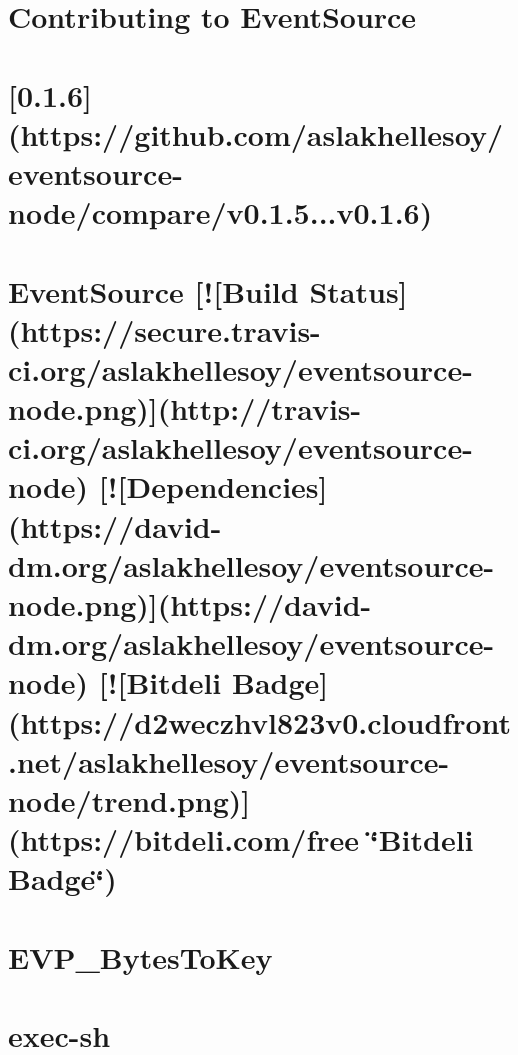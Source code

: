 \documentclass[twoside]{book}
\newcommand{\+}{\discretionary{\mbox{\scriptsize$\hookleftarrow$}}{}{}}
\begin{document}
\chapter{Contributing to Event\+Source}
\label{md__c_1_workspace_demo_src_main_script_node_modules_eventsource__c_o_n_t_r_i_b_u_t_i_n_g}

\chapter{\mbox{[}0.1.6\mbox{]}(https\+://github.com/aslakhellesoy/eventsource-\/node/compare/v0.1.5...v0.1.6)}
\label{md__c_1_workspace_demo_src_main_script_node_modules_eventsource__history}

\chapter{Event\+Source \mbox{[}!\mbox{[}Build Status\mbox{]}(https\+://secure.travis-\/ci.org/aslakhellesoy/eventsource-\/node.png)\mbox{]}(http\+://travis-\/ci.org/aslakhellesoy/eventsource-\/node) \mbox{[}!\mbox{[}Dependencies\mbox{]}(https\+://david-\/dm.org/aslakhellesoy/eventsource-\/node.png)\mbox{]}(https\+://david-\/dm.org/aslakhellesoy/eventsource-\/node) \mbox{[}!\mbox{[}Bitdeli Badge\mbox{]}(https\+://d2weczhvl823v0.cloudfront.\+net/aslakhellesoy/eventsource-\/node/trend.png)\mbox{]}(https\+://bitdeli.com/free \char`\"{}\+Bitdeli Badge\char`\"{})}
\label{md__c_1_workspace_demo_src_main_script_node_modules_eventsource__r_e_a_d_m_e}

\chapter{E\+V\+P\+\_\+\+Bytes\+To\+Key}
\label{md__c_1_workspace_demo_src_main_script_node_modules_evp_bytestokey_readme}

\chapter{exec-\/sh}
\label{md__c_1_workspace_demo_src_main_script_node_modules_exec-sh__r_e_a_d_m_e}

\end{document}
